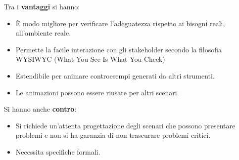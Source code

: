 Tra i \textbf{vantaggi} si hanno:
\begin{itemize}
      \item È modo migliore per verificare l'adeguatezza rispetto ai bisogni reali,
            all'ambiente reale.
      \item Permette la facile interazione con gli stakeholder secondo la filosofia
            WYSIWYC (What You See Is What You Check)
      \item Estendibile per animare controesempi generati da altri strumenti.
      \item Le animazioni possono essere riusate per altri scenari.
\end{itemize}
Si hanno anche \textbf{contro}:
\begin{itemize}
      \item Si richiede un'attenta progettazione degli scenari che possono presentare
            problemi e non si ha garanzia di non trascurare problemi critici.
      \item Necessita specifiche formali.
\end{itemize}
